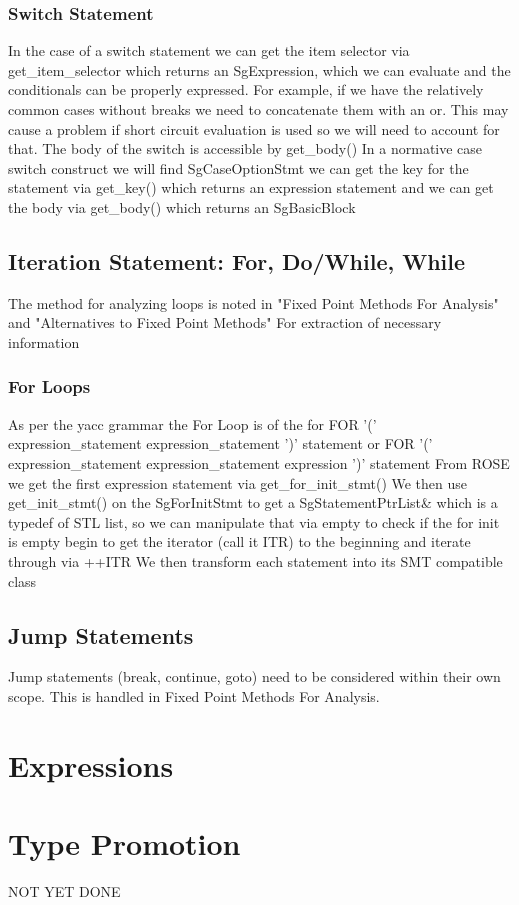 \documentclass[11pt]{article}
\begin{document}
{\begin{enumeration}
\subsubsection{Switch Statement}
In the case of a switch statement we can get the item selector via
get\_item\_selector
which returns an SgExpression, which we can evaluate and the conditionals can be properly expressed. For example, if we have the relatively common cases without breaks we need to concatenate them with an or. This may cause a problem if short circuit evaluation is used so we will need to account for that. The body of the switch is accessible by
get\_body()  
In a normative case switch construct we will find
SgCaseOptionStmt
we can get the key for the statement via
get\_key()
which returns an expression statement and we can get the body via
get\_body()
which returns an SgBasicBlock
\subsection{Iteration Statement: For, Do/While, While}
The method for analyzing loops is noted in "Fixed Point Methods For Analysis" and "Alternatives to Fixed Point Methods"
For extraction of necessary information
\subsubsection{For Loops}
As per the yacc grammar the For Loop is of the for
FOR '(' expression\_statement expression\_statement ')' statement
or
FOR '(' expression\_statement expression\_statement expression ')' statement
From ROSE we get the first expression statement via
get\_for\_init\_stmt()
We then use
get\_init\_stmt()
on the SgForInitStmt to get a 
SgStatementPtrList\&
which is a typedef of STL list, so we can manipulate that via
empty
to check if the for init is empty
begin
to get the iterator (call it ITR) to the beginning and iterate through via ++ITR
We then transform each statement into its SMT compatible class
\subsection{Jump Statements}
Jump statements (break, continue, goto) need to be considered within their own scope. This is handled in Fixed Point Methods For Analysis.
\section{Expressions}


\section{Type Promotion}
NOT YET DONE




\end{enumeration}}
\end{document}
